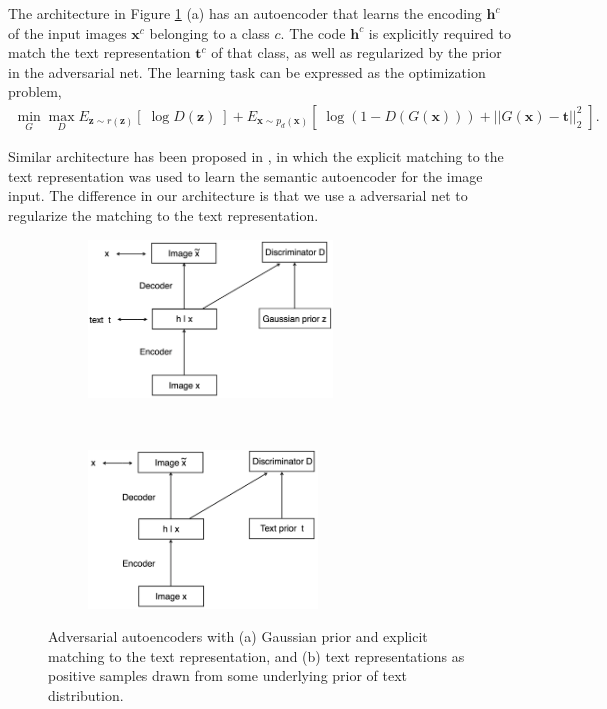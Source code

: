 \documentclass{article}
\newcommand{\bb}[1]{\boldsymbol{#1}}
\begin{document}
	The architecture in Figure \ref{fig:Architecture} (a) has an autoencoder that learns the encoding $\bb{h}^c$ of the input images $\bb{x}^c$ belonging to a class $c$. The code $\bb{h}^c$ is explicitly required to match the text representation $\bb{t}^c$ of that class, as well as regularized by the prior in the adversarial net. The learning task can be expressed as the optimization problem,
	\begin{align}
		\min_{G} \max_D E_{\bb{z} \sim r(\bb{z})}\left[\; \log D(\bb{z}) \;\right] + E_{\bb{x} \sim p_d(\bb{x})}\left[\; \log( 1 - D(G(\bb{x})) ) + || G(\bb{x}) - \bb{t} ||_2^2 \;\right].
	\end{align}
	
	Similar architecture has been proposed in \cite{kodirov2017semantic}, in which the explicit matching to the text representation was used to learn the semantic autoencoder for the image input. The difference in our architecture is that we use a adversarial net to regularize the matching to the text representation.
	


\begin{figure}[t!]
    \centering
    \begin{subfigure}[t]{0.5\textwidth}
        \centering
        \includegraphics[height=1.65in]{figNoisePrior}
        \caption{}
    \end{subfigure}%
    ~ 
    \begin{subfigure}[t]{0.5\textwidth}
        \centering
        \includegraphics[height=1.65in]{figTextPrior}
        \caption{}
    \end{subfigure}
    \caption{Adversarial autoencoders with (a) Gaussian prior and explicit matching to the text representation, and (b) text representations as positive samples drawn from some underlying prior of text distribution.}
    \label{fig:Architecture}
\end{figure}
\end{document}
